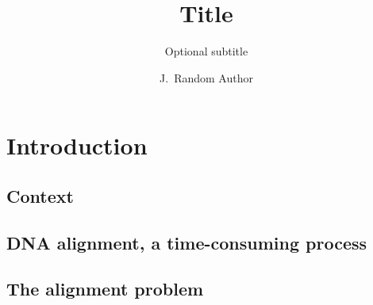 \documentclass[whitelogo]{tudelft-report}
\begin{document}
\frontmatter


\title[tudelft-white]{Title}
\subtitle[tudelft-black]{Optional subtitle}
\author[tudelft-white]{J.\ Random Author}
\makecover[split]





\tableofcontents

\mainmatter


\chapter{Introduction}
\label{chap:intro}


\section{Context}


\section{DNA alignment, a time-consuming process}


\section{The alignment problem}

\end{document}
